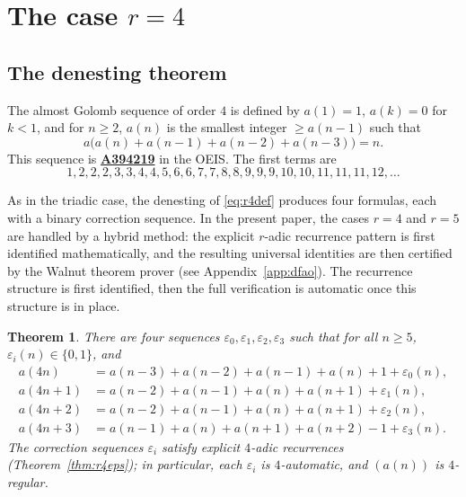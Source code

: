 \documentclass[12pt]{article}
\newtheorem{theorem}{Theorem}[section]
\theoremstyle{definition}
\theoremstyle{remark}
\newcommand{\oeis}[1]{\href{https://oeis.org/#1}{\textbf{#1}}}
\begin{document}
\section{The case $r=4$}\label{sec:r4}

\subsection{The denesting theorem}

The almost Golomb sequence of order $4$ is defined by $a(1)=1$, $a(k)=0$ for $k<1$,
and for $n\ge 2$, $a(n)$ is the smallest integer $\ge a(n-1)$ such that
\begin{equation}\label{eq:r4def}
  a\bigl(a(n)+a(n-1)+a(n-2)+a(n-3)\bigr) = n.
\end{equation}
This sequence is \oeis{A394219} in the OEIS. The first terms are
\[
  1,2,2,2,3,3,4,4,5,6,6,7,7,8,8,9,9,9,10,10,11,11,11,12,\ldots
\]

As in the triadic case, the denesting of \eqref{eq:r4def} produces four formulas,
each with a binary correction sequence.
In the present paper, the cases $r=4$ and $r=5$ are handled by a hybrid method:
the explicit $r$-adic recurrence pattern is first identified mathematically,
and the resulting universal identities are then certified by the Walnut theorem
prover (see Appendix~\ref{app:dfao}). The recurrence structure is first identified,
then the full verification is automatic once this structure is in place.

\begin{theorem}\label{thm:r4}
There are four sequences $\varepsilon_0, \varepsilon_1, \varepsilon_2, \varepsilon_3$ such that for all $n\ge 5$, $\varepsilon_i(n)\in\{0,1\}$, and
  \begin{align}
    a(4n)   &= a(n-3)+a(n-2)+a(n-1)+a(n)   + 1 + \varepsilon_0(n), \label{eq:r4a}\\
    a(4n+1) &= a(n-2)+a(n-1)+a(n)+a(n+1)   + \varepsilon_1(n),     \label{eq:r4b}\\
    a(4n+2) &= a(n-2)+a(n-1)+a(n)+a(n+1)   + \varepsilon_2(n),     \label{eq:r4c}\\
    a(4n+3) &= a(n-1)+a(n)+a(n+1)+a(n+2)   - 1 + \varepsilon_3(n). \label{eq:r4d}
  \end{align}
  The correction sequences $\varepsilon_i$ satisfy explicit $4$-adic recurrences
  (Theorem~\ref{thm:r4eps}); in particular, each $\varepsilon_i$ is $4$-automatic,
  and $(a(n))$ is $4$-regular.
\end{theorem}
\end{document}
